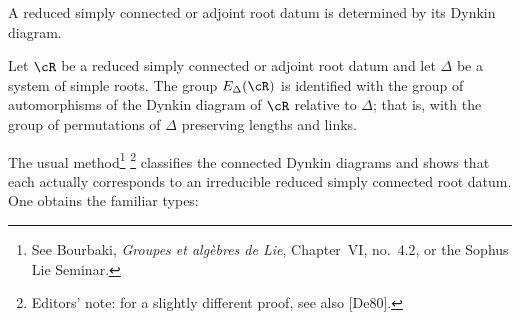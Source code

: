 \begin{corollary}\label{sga3:XXI:7.4.4}
A reduced simply connected or adjoint root datum is determined by
its Dynkin diagram.
\end{corollary}

\begin{corollary}\label{sga3:XXI:7.4.5}
Let \(\cR\) be a reduced simply connected or adjoint root datum and
let \(\Delta\) be a system of simple roots.  The group
\(E_\Delta(\cR)\) is identified with the group of automorphisms of
the Dynkin diagram of \(\cR\) relative to \(\Delta\); that is, with
the group of permutations of \(\Delta\) preserving lengths and
links.
\end{corollary}

\begin{remark}\label{sga3:XXI:7.4.6}
The usual method\footnote{See Bourbaki, \emph{Groupes et algèbres
de Lie}, Chapter~VI, no.~4.2, or the Sophus Lie Seminar.}
\footnote{Editors' note: for a slightly different proof, see also
[De80].}
classifies the connected Dynkin diagrams and shows that each
actually corresponds to an irreducible reduced simply connected
root datum.  One obtains the familiar types:
\begin{center}
\end{center}
\end{remark}

